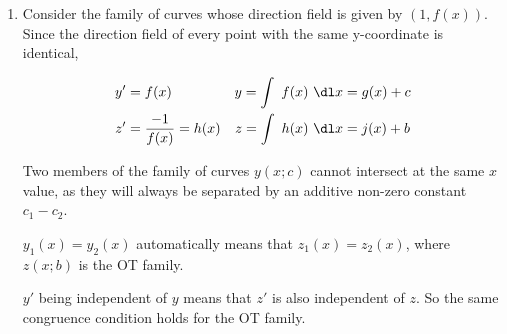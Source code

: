 \begin{enumerate}
    \item Consider the family of curves whose direction field is given by $ (1, f(x)) $.
          Since the direction field of every point with the same y-coordinate is
          identical,

          \begin{align}
              y' & = f(x)                   & y = \int\ f(x)\ \dl x & = g(x) + c \\
              z' & = \frac{-1}{f(x)} = h(x) & z = \int\ h(x)\ \dl x & = j(x) + b
          \end{align}

          Two members of the family of curves $ y(x;c) $ cannot intersect at the same
          $ x $ value, as they will always be separated by an additive non-zero
          constant $ c_{1} - c_{2} $.\par
          $ y_{1}(x) = y_{2}(x) $ automatically means that $ z_{1}(x) = z_{2}(x) $,
          where $ z(x;b) $ is the OT family. \par
          $ y' $ being independent of $ y $ means that $ z' $ is also independent
          of $ z $. So the same congruence condition holds for the OT family.
\end{enumerate}